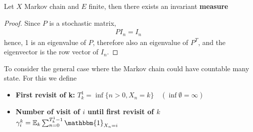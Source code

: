 \begin{lemma}
	Let $X$ Markov chain and $E$ finite, then there exists an invariant \textbf{measure}
\end{lemma}
\begin{proof}
	Since $P$ is a stochastic matrix, 
	\begin{align*}
		PI_n = I_n
	\end{align*}
	hence, 1 is an eigenvalue of $P$, therefore also an eigenvalue of $P^T$, and the eigenvector is the row vector of $I_n$.
\end{proof}

To consider the general case where the Markov chain could have countable many state. For this we define
\begin{itemize}
	\item \textbf{First revisit of k:}
	$T^1_k = \inf\{n > 0, X_n = k\} \quad (\inf \emptyset = \infty)$
	\item \textbf{Number of visit of $i$ until first revisit of $k$} $\gamma_i^k = \mathbb{E}_k \sum_{n = 0}^{T_k^1 -1} \mathbbm{1}_{X_n = i}$
\end{itemize}

